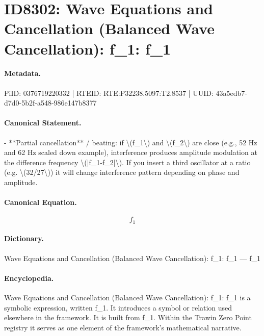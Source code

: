 \section*{ID8302: Wave Equations and Cancellation (Balanced Wave Cancellation): f\_1: f\_1}
\paragraph{Metadata.}
PiID: 0376719220332 | RTEID: RTE:P32238.5097:T2.8537 | UUID: 43a5edb7-d7d0-5b2f-a548-986e147b8377

\paragraph{Canonical Statement.}
- **Partial cancellation** / beating: if \textbackslash{}(f\_1\textbackslash{}) and \textbackslash{}(f\_2\textbackslash{}) are close (e.g., 52 Hz and 62 Hz scaled down example), interference produces amplitude modulation at the difference frequency \textbackslash{}(|f\_1-f\_2|\textbackslash{}). If you insert a third oscillator at a ratio (e.g. \textbackslash{}(32/27\textbackslash{})) it will change interference pattern depending on phase and amplitude.

\paragraph{Canonical Equation.}
\[
f_1
\]

\paragraph{Dictionary.}
Wave Equations and Cancellation (Balanced Wave Cancellation): f\_1: f\_1 — f\_1

\paragraph{Encyclopedia.}
Wave Equations and Cancellation (Balanced Wave Cancellation): f\_1: f\_1 is a symbolic expression, written f\_1. It introduces a symbol or relation used elsewhere in the framework. It is built from f\_1. Within the Trawin Zero Point registry it serves as one element of the framework's mathematical narrative.

